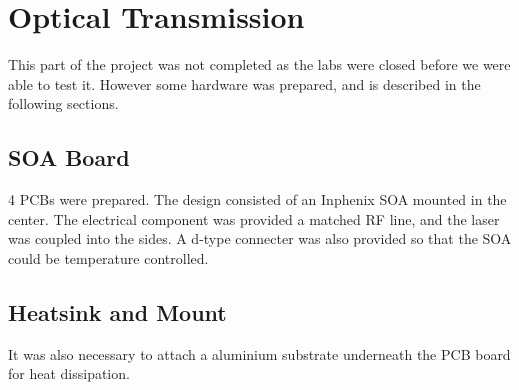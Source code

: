 \section{Optical Transmission}%
\label{optical_transmission}
This part of the project was not completed as the labs were closed before we
were able to test it. However some hardware was prepared, and is described in
the following sections.

\subsection{SOA Board}%
\label{sub:soa_board}
4 PCBs were prepared. The design consisted of an Inphenix SOA mounted in the
center. The electrical component was provided a matched RF line, and the laser
was coupled into the sides. A d-type connecter was also provided so that the
SOA could be temperature controlled.


\subsection{Heatsink and Mount}%
\label{sub:heatsink_and_mount}
It was also necessary to attach a aluminium substrate underneath the PCB board
for heat dissipation. 




